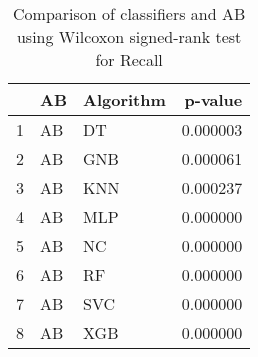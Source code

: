 \begin{table}
\footnotesize
\caption{Comparison of classifiers and AB using Wilcoxon signed-rank test for Recall}
\label{tab:AB wilcoxon Recall comparison}
\begin{tabular}{lllr}
\hline
 & AB & Algorithm & p-value \\
\hline
1 & AB & DT & 0.000003 \\
2 & AB & GNB & 0.000061 \\
3 & AB & KNN & 0.000237 \\
4 & AB & MLP & 0.000000 \\
5 & AB & NC & 0.000000 \\
6 & AB & RF & 0.000000 \\
7 & AB & SVC & 0.000000 \\
8 & AB & XGB & 0.000000 \\
\hline
\end{tabular}
\end{table}
